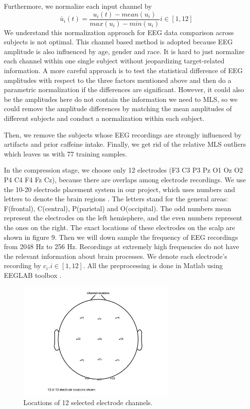 \documentclass[a4paper,11pt,oneside]{article}
\begin{document}
	Furthermore, we normalize each input channel by 
	$$ \bar{u}_i(t) = \frac{u_i(t) - mean(u_i)}{max(u_i) - min(u_i)} i \in [1, 12] $$
	We understand this normalization approach for EEG data comparison across subjects is not optimal. This channel based method is adopted because EEG amplitude is also influenced by age, gender and race. It is hard to just normalize each channel within one single subject without jeopardizing target-related information. A more careful approach is to test the statistical difference of EEG amplitudes with respect to the three factors mentioned above and then do a parametric normalization if the differences are significant. However, it could also be the amplitudes here do not contain the information we need to MLS, so we could remove the amplitude differences by matching the mean amplitudes of different subjects and conduct a normalization within each subject.
	
	Then, we remove the subjects whose EEG recordings are strongly influenced by artifacts and prior caffeine intake. Finally, we get rid of the relative MLS outliers which leaves us with 77 training samples.
		
	In the compression stage, we choose only 12 electrodes (F3 C3 P3 Pz O1 Oz O2 P4 C4 F4 Fz Cz), because  there are overlaps among electrode recordings. We use the 10-20 electrode placement system in our project, which uses numbers and letters to denote the brain regions \cite{klem1999ten}. The letters stand for the general areas: F(frontal), C(central), P(parietal) and O(occipital). The odd numbers mean represent the electrodes on the left hemisphere, and the even numbers represent the ones on the right. The exact locations of these electrodes on the scalp are shown in figure 9. Then we will down sample the frequency of EEG recordings from 2048 Hz to 256 Hz. Recordings at extremely high frequencies do not have the relevant information about brain processes. We denote each electrode's recording by $c_i. i \in [1, 12]$. 
	All the preprocessing is done in Matlab using EEGLAB toolbox \cite{delorme2004eeglab}.
	
	\begin{figure}[!h]
		\begin{center}
			\includegraphics[width=0.7\textwidth]{img/chanLocation}
		\end{center}
		\caption{Locations of 12 selected electrode channels.}
	\end{figure}
\end{document}
